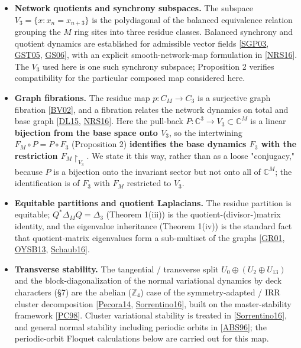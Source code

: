 \documentclass[
  11pt,
  a4paper,
]{article}
\providecommand{\tightlist}{%
  \setlength{\itemsep}{0pt}\setlength{\parskip}{0pt}}
\begin{document}
\begin{itemize}
\tightlist
\item
  \textbf{Network quotients and synchrony subspaces.} The subspace \(V_3=\{x:x_n=x_{n+3}\}\) is the polydiagonal of the balanced equivalence relation grouping the \(M\) ring sites into three residue classes. Balanced synchrony and quotient dynamics are established for admissible vector fields {[}\hyperlink{ref-SGP03}{SGP03}, \hyperlink{ref-GST05}{GST05}, \hyperlink{ref-GS06}{GS06}{]}, with an explicit smooth-network-map formulation in {[}\hyperlink{ref-NRS16}{NRS16}{]}. The \(V_3\) used here is one such synchrony subspace; Proposition 2 verifies compatibility for the particular composed map considered here.
\item
  \textbf{Graph fibrations.} The residue map \(p:C_M\to C_3\) is a surjective graph fibration {[}\hyperlink{ref-BV02}{BV02}{]}, and a fibration relates the network dynamics on total and base graph {[}\hyperlink{ref-DL15}{DL15}, \hyperlink{ref-NRS16}{NRS16}{]}. Here the pull-back \(P:\mathbb C^3\to V_3\subset\mathbb C^M\) is a linear \textbf{bijection from the base space onto \(V_3\)}, so the intertwining \(F_M\circ P=P\circ F_3\) (Proposition 2) \textbf{identifies the base dynamics \(F_3\) with the restriction \(F_M\!\restriction_{V_3}\)}. We state it this way, rather than as a loose "conjugacy," because \(P\) is a bijection onto the invariant sector but not onto all of \(\mathbb C^M\); the identification is of \(F_3\) with \(F_M\) restricted to \(V_3\).
\item
  \textbf{Equitable partitions and quotient Laplacians.} The residue partition is equitable; \(Q^\ast\Delta_M Q=\Delta_3\) (Theorem 1(iii)) is the quotient-(divisor-)matrix identity, and the eigenvalue inheritance (Theorem 1(iv)) is the standard fact that quotient-matrix eigenvalues form a sub-multiset of the graph\textquotesingle s {[}\hyperlink{ref-GR01}{GR01}, \hyperlink{ref-OYSB13}{OYSB13}, \hyperlink{ref-Schaub16}{Schaub16}{]}.
\item
  \textbf{Transverse stability.} The tangential / transverse split \(U_0\oplus(U_2\oplus U_{13})\) and the block-diagonalization of the normal variational dynamics by deck characters (§7) are the abelian (\(\mathbb Z_4\)) case of the symmetry-adapted / IRR cluster decomposition {[}\hyperlink{ref-Pecora14}{Pecora14}, \hyperlink{ref-Sorrentino16}{Sorrentino16}{]}, built on the master-stability framework {[}\hyperlink{ref-PC98}{PC98}{]}. Cluster variational stability is treated in {[}\hyperlink{ref-Sorrentino16}{Sorrentino16}{]}, and general normal stability including periodic orbits in {[}\hyperlink{ref-ABS96}{ABS96}{]}; the periodic-orbit Floquet calculations below are carried out for this map.
\end{itemize}
\end{document}

